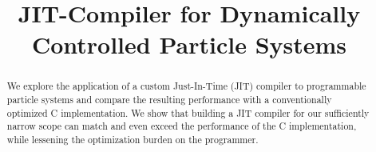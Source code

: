 \documentclass[letterpaper]{article}
\title{JIT-Compiler for Dynamically Controlled Particle Systems}
\begin{document}
%
\maketitle
%

\begin{abstract}
We explore the application of a custom Just-In-Time (JIT) compiler to
programmable particle systems and compare the resulting performance with
a conventionally optimized C implementation. We show that building a JIT
compiler for our sufficiently narrow scope can match and even exceed the
performance of the C implementation, while lessening the optimization
burden on the programmer.

\end{abstract}











%




\end{document}
